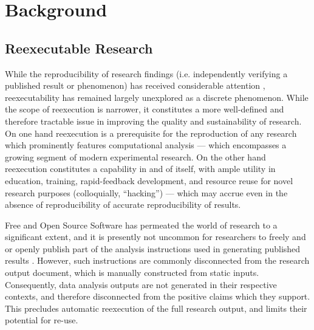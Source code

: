 \section{Background}

\subsection{Reexecutable Research}

While the reproducibility of research findings (i.e. independently verifying a published result or phenomenon) has received considerable attention \supercite{TODO}, reexecutability has remained largely unexplored as a discrete phenomenon.
While the scope of reexecution is narrower, it constitutes a more well-defined and therefore tractable issue in improving the quality and sustainability of research.
On one hand reexecution is a prerequisite for the reproduction of any research which prominently features computational analysis — which encompasses a growing segment of modern experimental research.
On the other hand reexecution constitutes a capability in and of itself, with ample utility in education, training, rapid-feedback development, and resource reuse for novel research purposes (colloquially, “hacking”) — which may accrue even in the absence of reproducibility of accurate reproducibility of results.

Free and Open Source Software \supercite{foss} has permeated the world of research to a significant extent, and it is presently not uncommon for researchers to freely and or openly publish part of the analysis instructions used in generating published results \supercite{TODO}.
However, such instructions are commonly disconnected from the research output document, which is manually constructed from static inputs.
Consequently, data analysis outputs are not generated in their respective contexts, and therefore disconnected from the positive claims which they support.
This precludes automatic reexecution of the full research output, and limits their potential for re-use.

